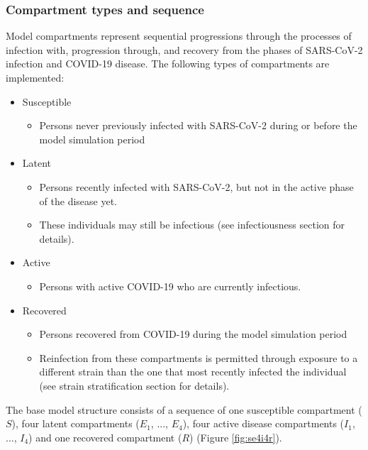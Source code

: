 \subsubsection{Compartment types and sequence}
Model compartments represent sequential progressions through the processes of 
infection with, progression through, and recovery from the phases of SARS-CoV-2
infection and COVID-19 disease. The following types of compartments are implemented:
\begin{itemize}
    \item Susceptible
    \begin{itemize}
        \item Persons never previously infected with SARS-CoV-2 during or before the model simulation period
    \end{itemize}
    \item Latent
    \begin{itemize}
        \item Persons recently infected with SARS-CoV-2, but not in the active phase of the disease yet.
        \item These individuals may still be infectious (see infectiousness section for details).
    \end{itemize}
    \item Active
    \begin{itemize}
        \item Persons with active COVID-19 who are currently infectious.
    \end{itemize}
    \item Recovered
    \begin{itemize}
        \item Persons recovered from COVID-19 during the model simulation period       
        \item Reinfection from these compartments is permitted through exposure to a different
        strain than the one that most recently infected the individual (see strain stratification section for details).
    \end{itemize}
\end{itemize}
The base model structure consists of a sequence of one susceptible compartment ($S$), four latent compartments ($E_1$, ..., $E_4$), four active disease compartments ($I_1$, ..., $I_4$) and one recovered compartment ($R$) (Figure \ref{fig:se4i4r}).

